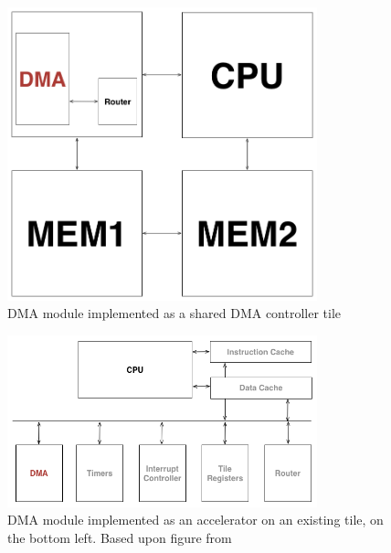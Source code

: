 \begin{figure}[htb]
    \centering
    \includegraphics[width=0.8\textwidth]{Figures/DMA/DMATile}
    \caption{DMA module implemented as a shared DMA controller tile}
    \label{fig:DMATile}
\end{figure}

\begin{figure}[htb]
    \centering
    \includegraphics[width=0.8\textwidth]{Figures/DMA/Accelerator}
    \caption{DMA module implemented as an accelerator on an existing tile, on the bottom left. Based upon figure from \cite{shmac-plan}}
    \label{fig:DMAAccelerator}
\end{figure}


